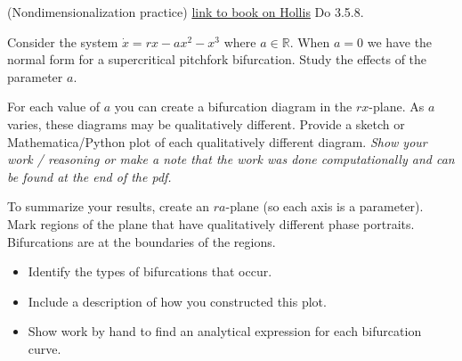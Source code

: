 \documentclass[12pt,letterpaper]{exam}
\begin{document}
\begin{questions}



\question (Nondimensionalization practice) 
{\color{blue}\href{https://hollis.harvard.edu/primo-explore/fulldisplay?docid=01HVD_ALMA512272214860003941&context=L&vid=HVD2&lang=en_US&search_scope=everything&adaptor=Local%20Search%20Engine&tab=everything&query=any,contains,strogatz%20nonlinear&offset=0}{link to book on Hollis}}
Do 3.5.8.

\question Consider the system $\dot x = r x - ax^2 - x^3$ where $a\in \mathbb{R}$.  When $a = 0$ we have the normal form for a supercritical pitchfork bifurcation.  Study the effects of the parameter $a$.
\begin{parts}
\item For each value of $a$ you can create a bifurcation diagram in the $rx$-plane.  As $a$ varies, these diagrams may be qualitatively different.  Provide a sketch or Mathematica/Python plot of each qualitatively different diagram.  \emph{Show your work / reasoning or make a note that the work was done computationally and can be found at the end of the pdf.}
\item To summarize your results, create an $ra$-plane (so each axis is a parameter).  Mark regions of the plane that have qualitatively different phase portraits.  Bifurcations are at the boundaries of the regions.  
\begin{itemize}
    \item Identify the types of bifurcations that occur. 
    \item Include a description of how you constructed this plot.
    \item Show work by hand to find an analytical expression for each bifurcation curve.


\end{itemize}
\end{parts}
\end{questions}
\end{document}
